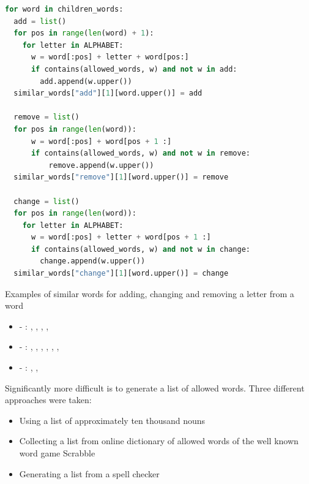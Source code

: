 \begin{lstlisting}[language=Python,caption={Algorithm to generate a list of similar words in Python},label={lst:similarWords}]
for word in children_words:
  add = list()
  for pos in range(len(word) + 1):
    for letter in ALPHABET:
      w = word[:pos] + letter + word[pos:]
      if contains(allowed_words, w) and not w in add:
        add.append(w.upper())
  similar_words["add"][1][word.upper()] = add

  remove = list()
  for pos in range(len(word)):
      w = word[:pos] + word[pos + 1 :]
      if contains(allowed_words, w) and not w in remove:
          remove.append(w.upper())
  similar_words["remove"][1][word.upper()] = remove

  change = list()
  for pos in range(len(word)):
    for letter in ALPHABET:
      w = word[:pos] + letter + word[pos + 1 :]
      if contains(allowed_words, w) and not w in change:
        change.append(w.upper())
  similar_words["change"][1][word.upper()] = change
\end{lstlisting}

\begin{example}
  Examples of similar words for adding, changing and removing a letter from a word
  \begin{itemize}
    \item {} - : , , , , 
    \item {} - : , , , , , , 
    \item {} - : , , 
  \end{itemize}
\end{example}

Significantly more difficult is to generate a list of allowed words. Three different approaches were taken:

\begin{itemize}
  \item Using a list of approximately ten thousand nouns
  \item Collecting a list from online dictionary of allowed words of the well known word game Scrabble \cite{Scrabble}
  \item Generating a list from a spell checker
\end{itemize}

